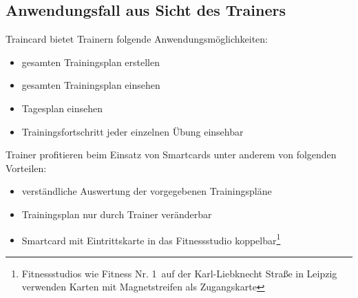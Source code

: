 \subsection{Anwendungsfall aus Sicht des Trainers}
\label{subsec:1.2}
Traincard bietet Trainern folgende Anwendungsmöglichkeiten:
\begin{itemize}
\item gesamten Trainingsplan erstellen
\item gesamten Trainingsplan einsehen
\item Tagesplan einsehen
\item Trainingsfortschritt jeder einzelnen Übung einsehbar
\end{itemize}

Trainer profitieren beim Einsatz von Smartcards unter anderem von folgenden Vorteilen:
\begin{itemize}
\item verständliche Auswertung der vorgegebenen Trainingspläne
\item Trainingsplan nur durch Trainer veränderbar
\item Smartcard mit Eintrittskarte in das Fitnessstudio koppelbar\footnote{Fitnessstudios wie \glqq Fitness Nr. 1\grqq \ auf der Karl-Liebknecht Straße in Leipzig verwenden Karten mit Magnetstreifen als Zugangskarte}
\end{itemize}